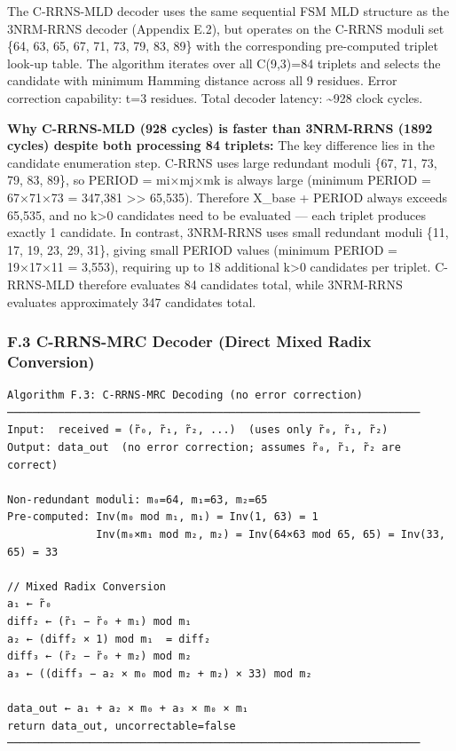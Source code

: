 The C-RRNS-MLD decoder uses the same sequential FSM MLD structure as the
3NRM-RRNS decoder (Appendix E.2), but operates on the C-RRNS moduli set
\{64, 63, 65, 67, 71, 73, 79, 83, 89\} with the corresponding
pre-computed triplet look-up table. The algorithm iterates over all
C(9,3)=84 triplets and selects the candidate with minimum Hamming
distance across all 9 residues. Error correction capability: t=3
residues. Total decoder latency: \textasciitilde928 clock cycles.

\textbf{Why C-RRNS-MLD (928 cycles) is faster than 3NRM-RRNS (1892
cycles) despite both processing 84 triplets:} The key difference lies in
the candidate enumeration step. C-RRNS uses large redundant moduli \{67,
71, 73, 79, 83, 89\}, so PERIOD = mi×mj×mk is always large (minimum
PERIOD = 67×71×73 = 347,381 \textgreater\textgreater{} 65,535).
Therefore X\_base + PERIOD always exceeds 65,535, and no k\textgreater0
candidates need to be evaluated --- each triplet produces exactly 1
candidate. In contrast, 3NRM-RRNS uses small redundant moduli \{11, 17,
19, 23, 29, 31\}, giving small PERIOD values (minimum PERIOD = 19×17×11
= 3,553), requiring up to 18 additional k\textgreater0 candidates per
triplet. C-RRNS-MLD therefore evaluates 84 candidates total, while
3NRM-RRNS evaluates approximately 347 candidates total.

\subsubsection{F.3 C-RRNS-MRC Decoder (Direct Mixed Radix
Conversion)}\label{f.3-c-rrns-mrc-decoder-direct-mixed-radix-conversion}

\begin{verbatim}
Algorithm F.3: C-RRNS-MRC Decoding (no error correction)
─────────────────────────────────────────────────────────────────
Input:  received = (r̃₀, r̃₁, r̃₂, ...)  (uses only r̃₀, r̃₁, r̃₂)
Output: data_out  (no error correction; assumes r̃₀, r̃₁, r̃₂ are correct)

Non-redundant moduli: m₀=64, m₁=63, m₂=65
Pre-computed: Inv(m₀ mod m₁, m₁) = Inv(1, 63) = 1
              Inv(m₀×m₁ mod m₂, m₂) = Inv(64×63 mod 65, 65) = Inv(33, 65) = 33

// Mixed Radix Conversion
a₁ ← r̃₀
diff₂ ← (r̃₁ − r̃₀ + m₁) mod m₁
a₂ ← (diff₂ × 1) mod m₁  = diff₂
diff₃ ← (r̃₂ − r̃₀ + m₂) mod m₂
a₃ ← ((diff₃ − a₂ × m₀ mod m₂ + m₂) × 33) mod m₂

data_out ← a₁ + a₂ × m₀ + a₃ × m₀ × m₁
return data_out, uncorrectable=false
─────────────────────────────────────────────────────────────────
\end{verbatim}

